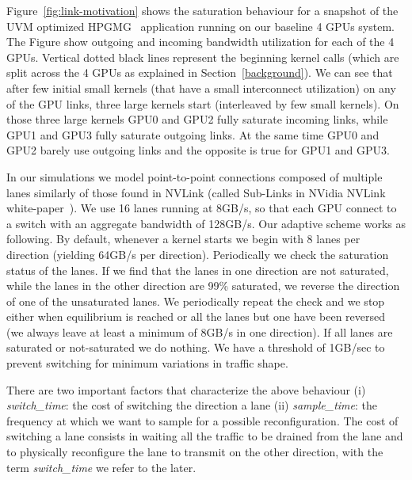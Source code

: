 Figure~\ref{fig:link-motivation} shows the saturation behaviour for a 
snapshot of the UVM optimized 
HPGMG~\cite{adams2014hpgmg} application running on our baseline 4 GPUs system. The Figure 
show outgoing and incoming bandwidth utilization for each of the 4 GPUs. 
Vertical dotted black lines represent the beginning kernel calls (which are 
split across the 4 GPUs as explained in Section~\ref{background}). We can see 
that after few initial small kernels (that have a small interconnect 
utilization) on any of the GPU links, three large kernels start (interleaved 
by few small kernels). On those three large kernels GPU0 and GPU2 fully 
saturate incoming links, while GPU1 and GPU3 fully saturate outgoing links. 
At the same time GPU0 and GPU2 barely use outgoing links and the opposite is 
true for GPU1 and GPU3.

In our simulations we model point-to-point connections composed of multiple 
lanes similarly of those found in NVLink (called Sub-Links in NVidia NVLink 
white-paper~\cite{pascal-tesla-wp}). We use 16 lanes running at 8GB/s, so 
that each GPU connect to a switch with an aggregate bandwidth of 128GB/s. 
Our adaptive scheme works as following. By default, whenever a kernel starts 
we begin with 8 lanes per direction (yielding 64GB/s per direction). 
Periodically we check the saturation status of the lanes. If we find that 
the lanes in one direction are not saturated, while the lanes in the other 
direction are 99\% saturated, we reverse the direction of one of the 
unsaturated lanes. We periodically repeat the check and we stop either when 
equilibrium is reached or all the lanes but one have been reversed (we always 
leave at least a minimum of 8GB/s in one direction). If all 
lanes are saturated or not-saturated we do nothing. We have a threshold of 
1GB/sec to prevent switching for minimum variations in traffic shape.

There are two important factors that characterize the above behaviour (i) 
\emph{switch\_time}: the cost of switching the direction a lane (ii) 
\emph{sample\_time}: the frequency at which we want to sample for a possible 
reconfiguration. The cost of switching a lane consists in waiting all 
the traffic to be drained from the lane and to physically reconfigure the 
lane to transmit on the other direction, with the term \emph{switch\_time} we 
refer to the later. 



